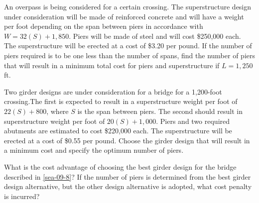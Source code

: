 \begin{exercises}
    \begin{exercise}
    \label{sea-09-07}
        An overpass is being considered for a certain crossing. The superstructure design under consideration will be made of reinforced concrete and will have a weight per foot depending on the span between piers in accordance with $W=32(S)+1,850$. Piers will be made of steel and will cost \$250,000 each. The superstructure will be erected at a cost of \$3.20 per pound. If the number of piers required is to be one less than the number of spans, find the number of piers that will result in a minimum total cost for piers and superstructure if $L=1,250$ft. 
    \end{exercise}
    \begin{solution}
    \end{solution}
    
    \begin{exercise}
    \label{sea-09-08}
        Two girder designs are under consideration for a bridge for a 1,200-foot crossing.The first is expected to result in a superstructure weight per foot of $22(S)+800$, where $S$ is the span between piers. The second should result in superstructure weight per foot of $20(S)+1,000$. Piers and two required abutments are estimated to cost \$220,000 each. The superstructure will be erected at a cost of \$0.55 per pound. Choose the girder design that will result in a minimum cost and specify the optimum number of piers.
    \end{exercise}
    \begin{solution}
    \end{solution}
    
    \begin{exercise}
    \label{sea-09-09}
        What is the cost advantage of choosing the best girder design for the bridge described in \ref{sea-09-8}? If the number of piers is determined from the best girder design alternative, but the other design alternative is adopted, what cost penalty is incurred?
    \end{exercise}
    \begin{solution}
    \end{solution}
    

\end{exercises}
